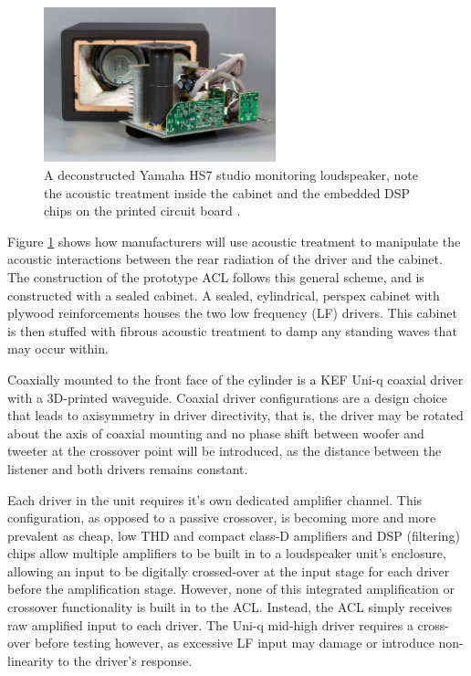 \documentclass{report}
\begin{document}
        \begin{figure}[H]
            \centering
            \includegraphics[width = 0.6\textwidth]{figs/hs-7back.jpg}
            \caption{A deconstructed Yamaha HS7 studio monitoring loudspeaker, note the acoustic treatment inside the cabinet and the embedded DSP chips on the printed circuit board \cite{ASRcrosssection}.}
            \label{hs-7back}
        \end{figure}

        Figure \ref{hs-7back} shows how manufacturers will use acoustic treatment to manipulate the acoustic interactions between the rear radiation of the driver and the cabinet.
        The construction of the prototype ACL follows this general scheme, and is constructed with a sealed cabinet.
        A sealed, cylindrical, perspex cabinet with plywood reinforcements houses the two low frequency (LF) drivers.
        This cabinet is then stuffed with fibrous acoustic treatment to damp any standing waves that may occur within.

        Coaxially mounted to the front face of the cylinder is a KEF Uni-q coaxial driver with a 3D-printed waveguide.
        Coaxial driver configurations are a design choice that leads to axisymmetry in driver directivity, that is, the driver may be rotated about the axis of coaxial mounting and no phase shift between woofer and tweeter at the crossover point will be introduced, as the distance between the listener and both drivers remains constant.

        Each driver in the unit requires it's own dedicated amplifier channel.
        This configuration, as opposed to a passive crossover, is becoming more and more prevalent as cheap, low THD and compact class-D amplifiers and DSP (filtering) chips allow multiple amplifiers to be built in to a loudspeaker unit's enclosure, allowing an input to be digitally crossed-over at the input stage for each driver before the amplification stage.
        However, none of this integrated amplification or crossover functionality is built in to the ACL.
        Instead, the ACL simply receives raw amplified input to each driver.
        The Uni-q mid-high driver requires a cross-over before testing however, as excessive LF input may damage or introduce non-linearity to the driver's response.
\end{document}
